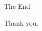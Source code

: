\documentclass[xcolor={dvipsnames,usenames}]{beamer}
\begin{document}














\begin{frame}{The End}
\begin{center}
	Thank you.
\end{center}
\end{frame}

%
%
\end{document}
